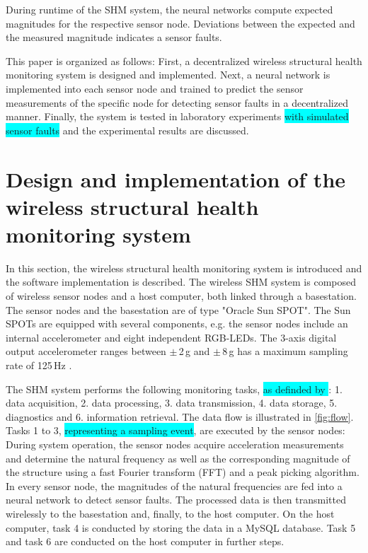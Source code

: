 \documentclass[12pt,a4paper]{scrartcl}
\begin{document}
During runtime of the SHM system, the neural networks compute expected magnitudes for the respective sensor node.
Deviations between the expected and the measured magnitude indicates a sensor faults.

This paper is organized as follows:
First, a decentralized wireless structural health monitoring system is designed and implemented. 
Next, a neural network is implemented into each sensor node and trained to predict the sensor measurements of the specific node for detecting sensor faults in a decentralized manner. 
Finally, the system is tested in laboratory experiments \colorbox{cyan}{with simulated sensor faults} and the experimental results are discussed.



\section*{Design and implementation of the wireless structural health monitoring system}
In this section, the wireless structural health monitoring system is introduced and the software implementation is described.
The wireless SHM system is composed of wireless sensor nodes and a host computer, both linked through a basestation.
The sensor nodes and the basestation are of type "Oracle Sun SPOT". 
The Sun SPOTs are equipped with several components, e.g. the sensor nodes include an internal accelerometer and eight independent RGB-LEDs.
The 3-axis digital output accelerometer ranges between $\pm$\,2\,g and $\pm$\,8\,g has a maximum sampling rate of 125\,Hz \citep{eDemo2010}.

The SHM system performs the following monitoring tasks, \colorbox{cyan}{as definded by \citet{BisbySHM}}:
1. data acquisition,
2. data processing,
3. data transmission, 
4. data storage,
5. diagnostics and 
6. information retrieval.
The data flow is illustrated in \autoref{fig:flow}.
Tasks 1 to 3, \colorbox{cyan}{representing a sampling event}, are executed by the sensor nodes: During system operation, the sensor nodes acquire acceleration measurements and determine the natural frequency as well as the corresponding magnitude of the structure using a fast Fourier transform (FFT) and a peak picking algorithm.
In every sensor node, the magnitudes of the natural frequencies are fed into a neural network to detect sensor faults.
The processed data is then transmitted wirelessly to the basestation and, finally, to the host computer.
On the host computer, task 4 is conducted by storing the data in a MySQL database.
Task 5 and task 6 are conducted on the host computer in further steps.
\end{document}
